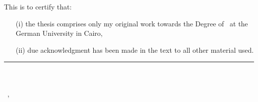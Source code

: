 \thispagestyle{plain}

This is to certify that:
\begin{itemize}
\item[(i)] the thesis comprises only my original work towards the Degree of \typeOfThesis \ at the German University in Cairo,
\item[(ii)] due acknowledgment has been made in the text to all other material used.
\end{itemize}

\vspace{2cm}
\begin{flushright}
\rule[0mm]{6cm}{0.2mm}\\
\authorOfThesis\\
\submissionDay~\submissionMonth,~\submissionYear\\
\end{flushright}
\clearpage